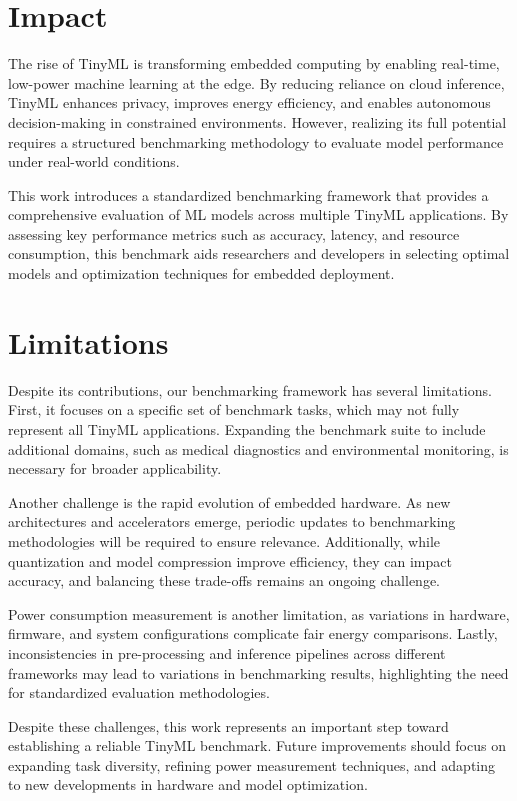 \documentclass[conference]{IEEEtran}
\begin{document}
\section{Impact}

The rise of TinyML is transforming embedded computing by enabling real-time, low-power machine learning at the edge. By reducing reliance on cloud inference, TinyML enhances privacy, improves energy efficiency, and enables autonomous decision-making in constrained environments. However, realizing its full potential requires a structured benchmarking methodology to evaluate model performance under real-world conditions.

This work introduces a standardized benchmarking framework that provides a comprehensive evaluation of ML models across multiple TinyML applications. By assessing key performance metrics such as accuracy, latency, and resource consumption, this benchmark aids researchers and developers in selecting optimal models and optimization techniques for embedded deployment.


\section{Limitations}

Despite its contributions, our benchmarking framework has several limitations. First, it focuses on a specific set of benchmark tasks, which may not fully represent all TinyML applications. Expanding the benchmark suite to include additional domains, such as medical diagnostics and environmental monitoring, is necessary for broader applicability.

Another challenge is the rapid evolution of embedded hardware. As new architectures and accelerators emerge, periodic updates to benchmarking methodologies will be required to ensure relevance. Additionally, while quantization and model compression improve efficiency, they can impact accuracy, and balancing these trade-offs remains an ongoing challenge.

Power consumption measurement is another limitation, as variations in hardware, firmware, and system configurations complicate fair energy comparisons. Lastly, inconsistencies in pre-processing and inference pipelines across different frameworks may lead to variations in benchmarking results, highlighting the need for standardized evaluation methodologies.

Despite these challenges, this work represents an important step toward establishing a reliable TinyML benchmark. Future improvements should focus on expanding task diversity, refining power measurement techniques, and adapting to new developments in hardware and model optimization.
\end{document}
